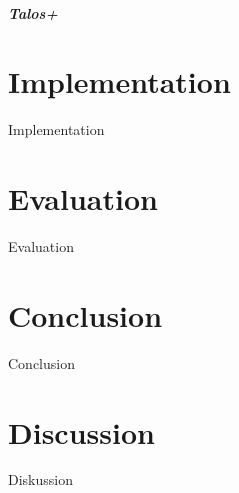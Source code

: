 \documentclass[a4paper,11pt]{report}
\begin{document}
\paragraph{Talos+}
\chapter{Implementation}
Implementation
\chapter{Evaluation}
Evaluation
\chapter{Conclusion}
Conclusion
\chapter{Discussion}
Diskussion

\cleardoublepage
\nocite{*}



\appendix
\end{document}
